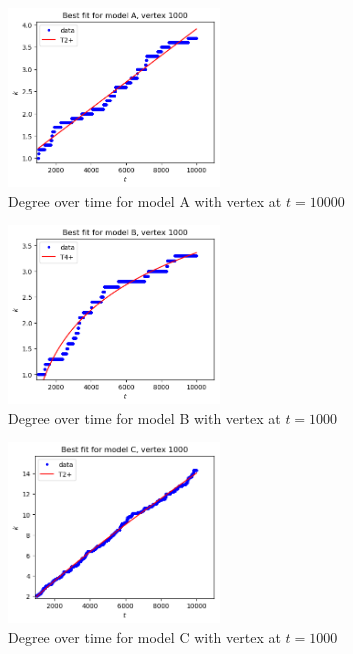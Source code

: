 \documentclass[a4paper]{article}
\begin{document}
%
\begin{figure}[H]
    \centering
		\includegraphics[width=0.5\textwidth]{modelA/best_dt1000.png}
		\caption{Degree over time for model A with vertex at $t=10000$}
\end{figure}
%
\begin{figure}[H]
    \centering
		\includegraphics[width=0.5\textwidth]{modelB/best_dt1000.png}
		\caption{Degree over time for model B with vertex at $t=1000$}
\end{figure}
%
\begin{figure}[H]
		\centering
		\includegraphics[width=0.5\textwidth]{modelC/best_dt1000.png}
		\caption{Degree over time for model C with vertex at $t=1000$}
		\label{fig:bestC_dt1000}
\end{figure}

%
%
\end{document}
